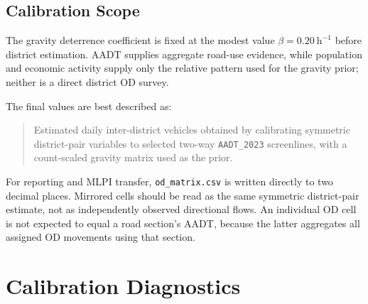 \documentclass[11pt,a4paper]{article}
\begin{document}
\subsection{Calibration Scope}

The gravity deterrence coefficient is fixed at the modest value
$\beta=0.20~\mathrm{h}^{-1}$ before district estimation. AADT supplies aggregate
road-use evidence, while population and economic activity supply only the
relative pattern used for the gravity prior; neither is a direct district OD
survey.

The final values are best described as:

\begin{quote}
Estimated daily inter-district vehicles obtained by calibrating symmetric
district-pair variables to selected two-way \texttt{AADT\_2023} screenlines,
with a count-scaled gravity matrix used as the prior.
\end{quote}

For reporting and MLPI transfer, \texttt{od\_matrix.csv} is written directly to
two decimal places. Mirrored cells should be read as the same symmetric
district-pair estimate, not as independently observed directional flows. An
individual OD cell is not expected to equal a road section's AADT, because the
latter aggregates all assigned OD movements using that section.

\section{Calibration Diagnostics}
\end{document}
